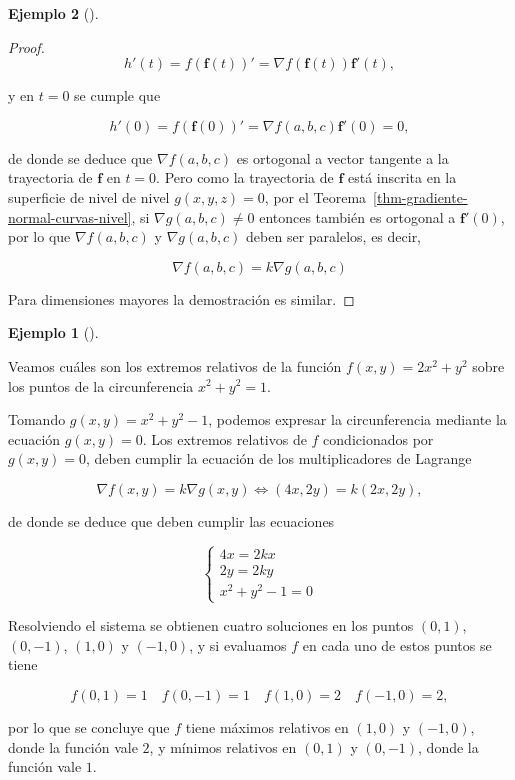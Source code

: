 \documentclass[
  a4paper,
]{scrreport}
\theoremstyle{definition}
\newtheorem{example}{Ejemplo}[chapter]
\theoremstyle{plain}
\theoremstyle{definition}
\theoremstyle{definition}
\theoremstyle{plain}
\theoremstyle{plain}
\theoremstyle{remark}
\begin{document}
\begin{example}[]
\begin{tcolorbox}
\begin{proof}
\[
h'(t) 
= f(\mathbf{f}(t))' 
= \nabla f(\mathbf{f}(t))\mathbf{f}'(t),
\]

y en \(t=0\) se cumple que

\[
h'(0) 
= f(\mathbf{f}(0))' 
= \nabla f(a,b,c)\mathbf{f}'(0) 
=0,
\]

de donde se deduce que \(\nabla f(a,b,c)\) es ortogonal a vector
tangente a la trayectoria de \(\mathbf{f}\) en \(t=0\). Pero como la
trayectoria de \(\mathbf{f}\) está inscrita en la superficie de nivel de
nivel \(g(x,y,z)=0\), por el
Teorema~\ref{thm-gradiente-normal-curvas-nivel}, si
\(\nabla g(a,b,c)\neq 0\) entonces también es ortogonal a
\(\mathbf{f}'(0)\), por lo que \(\nabla f(a,b,c)\) y \(\nabla g(a,b,c)\)
deben ser paralelos, es decir,

\[
\nabla f(a,b,c)
= k\nabla g(a,b,c)
\]

Para dimensiones mayores la demostración es similar.
\end{proof}

\end{tcolorbox}

\begin{example}[]\protect\hypertarget{exm-multiplicadores-lagrange}{}\label{exm-multiplicadores-lagrange}

Veamos cuáles son los extremos relativos de la función
\(f(x,y)=2x^2+y^2\) sobre los puntos de la circunferencia \(x^2+y^2=1\).

Tomando \(g(x,y)=x^2+y^2-1\), podemos expresar la circunferencia
mediante la ecuación \(g(x,y)=0\). Los extremos relativos de \(f\)
condicionados por \(g(x,y)=0\), deben cumplir la ecuación de los
multiplicadores de Lagrange

\[
\nabla f(x,y) = k \nabla g(x,y) 
\Leftrightarrow (4x, 2y) = k (2x, 2y),
\]

de donde se deduce que deben cumplir las ecuaciones

\[
\begin{cases}
4x = 2kx\\
2y = 2ky\\
x^2+y^2-1=0
\end{cases}
\]

Resolviendo el sistema se obtienen cuatro soluciones en los puntos
\((0,1)\), \((0,-1)\), \((1,0)\) y \((-1,0)\), y si evaluamos \(f\) en
cada uno de estos puntos se tiene

\[
f(0,1) = 1 \quad f(0,-1) = 1 \quad f(1,0)=2 \quad f(-1,0)=2,
\]

por lo que se concluye que \(f\) tiene máximos relativos en \((1,0)\) y
\((-1,0)\), donde la función vale \(2\), y mínimos relativos en
\((0,1)\) y \((0,-1)\), donde la función vale \(1\).


\end{example}
\end{example}
\end{document}

